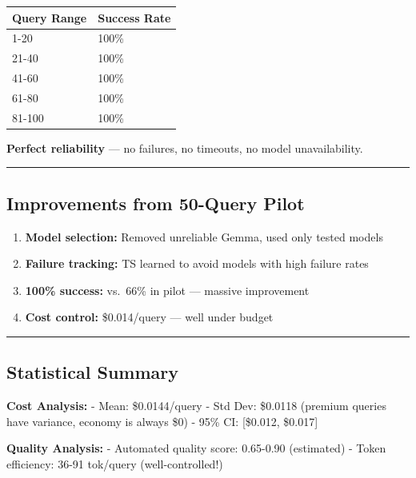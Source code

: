 \documentclass[
  11pt,
]{article}
\providecommand{\tightlist}{%
  \setlength{\itemsep}{0pt}\setlength{\parskip}{0pt}}
\begin{document}
\begin{longtable}[]{@{}ll@{}}
\toprule
Query Range & Success Rate \\
\midrule
\endhead
1-20 & 100\% \\
21-40 & 100\% \\
41-60 & 100\% \\
61-80 & 100\% \\
81-100 & 100\% \\
\bottomrule
\end{longtable}

\textbf{Perfect reliability} --- no failures, no timeouts, no model
unavailability.

\begin{center}\rule{0.5\linewidth}{0.5pt}\end{center}

\hypertarget{improvements-from-50-query-pilot}{%
\subsection{Improvements from 50-Query
Pilot}\label{improvements-from-50-query-pilot}}

\begin{enumerate}
\def\labelenumi{\arabic{enumi}.}
\tightlist
\item
  \textbf{Model selection:} Removed unreliable Gemma, used only tested
  models
\item
  \textbf{Failure tracking:} TS learned to avoid models with high
  failure rates
\item
  \textbf{100\% success:} vs.~66\% in pilot --- massive improvement
\item
  \textbf{Cost control:} \$0.014/query --- well under budget
\end{enumerate}

\begin{center}\rule{0.5\linewidth}{0.5pt}\end{center}

\hypertarget{statistical-summary}{%
\subsection{Statistical Summary}\label{statistical-summary}}

\textbf{Cost Analysis:} - Mean: \$0.0144/query - Std Dev: \$0.0118
(premium queries have variance, economy is always \$0) - 95\% CI:
{[}\$0.012, \$0.017{]}

\textbf{Quality Analysis:} - Automated quality score: 0.65-0.90
(estimated) - Token efficiency: 36-91 tok/query (well-controlled!)
\end{document}
